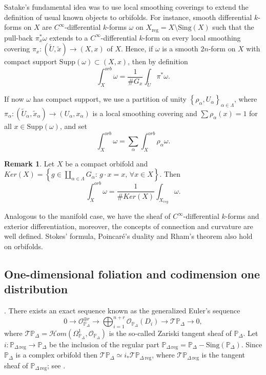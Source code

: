\documentclass[11pt]{amsart}
\theoremstyle{plain}
\theoremstyle{definition}
\newtheorem{obs}{Remark}[section]
\begin{document}
Satake's fundamental idea was to use local smoothing coverings to extend the
definition of usual known objects to orbifolds. For instance, smooth differential $k$-forms
on $X$ are $C^{\infty}$-differential $k$-forms $\omega$ on $X_{\mathrm{reg}}=X \setminus \mathrm{Sing}(X)$ such that the pull-back
$\pi^{\ast}_x\omega$ extends to a $C^{\infty}$-differential $k$-form on every local smoothing covering 
$\pi_x:(\widetilde{U},\tilde{x})\rightarrow(X,x)$ of $X$. Hence, if $\omega$ is a smooth $2n$-form on $X$ with compact support 
$\mathrm{Supp}(\omega)\subset(X, x)$, then by definition
$$\int_X^{orb} \omega=\frac{1}{\# G_x}\int_{\widetilde{U}}\pi^{\ast}\omega.$$

If now $\omega$ has compact support, we use a partition of unity 
$\left\{\rho_{\alpha},U_{\alpha}\right\}_{\alpha\in\Lambda}$, where
$\pi_{\alpha}:(\widetilde{U}_{\alpha},\tilde{x}_{\alpha})\rightarrow(U_{\alpha},x_{\alpha})$ is a local smoothing covering and
$\sum \rho_{\alpha}(x)=1$ for all $x\in\mathrm{Supp}(\omega)$, and set
$$\int_X^{orb} \omega=\sum_{\alpha}\int_{X}^{orb}\rho_{\alpha}\omega.$$

\begin{obs}\cite{Man} Let $X$ be a compact orbifold and 
$Ker(X)=\left\{g\in\coprod_{\alpha\in\Lambda}G_{\alpha}:\,g\cdot x=x,\,\forall x\in X\right\}$. Then 
$$\int_X^{orb} \omega=\frac{1}{\# Ker(X)}\int_{X_{reg}}\omega.$$
\end{obs}

Analogous to the manifold case, we have the sheaf of $C^{\infty}$-differential $k$-forms and
exterior differentiation, moreover, the concepts of connection and curvature are well defined. 
Stokes' formula, Poincar\'e's duality and Rham's theorem also hold on orbifolds.

\subsection{One-dimensional foliation and codimension one distribution} \cite{Mau, Jou, Mig2, Ro}.
There exists an exact sequence known as the generalized Euler's sequence 
$$0\rightarrow \mathcal{O}_{\mathbb{P}_{\Delta}}^{\oplus
r}\rightarrow\bigoplus_{i=1}^{n+r}\mathcal{O}_{\mathbb{P}_{\Delta}}(D_i)\rightarrow
\mathcal{T}\mathbb{P}_{\Delta}\rightarrow0,$$
\noindent where
$\mathcal{T}\mathbb{P}_{\Delta}=\mathcal{H}om(\Omega_{\mathbb{P}_{\Delta}}^1,\mathcal{O}_{\mathbb{P}_{\Delta}})$ is the so-called Zariski tangent sheaf of $\mathbb{P}_{\Delta}$. 
Let $i:\mathbb{P}_{\Delta \,\mathrm{reg}} \rightarrow \mathbb{P}_{\Delta}$
be the inclusion of the regular part $\mathbb{P}_{\Delta \,\mathrm{reg}}= \mathbb{P}_{\Delta} - \mathrm{Sing}(\mathbb{P}_{\Delta})$.
Since $\mathbb{P}_{\Delta}$ is a complex orbifold then $\mathcal{T}\mathbb{P}_{\Delta} \simeq 
i_{\ast}\mathcal{T}\mathbb{P}_{\Delta \,\mathrm{reg}}$, where $\mathcal{T}\mathbb{P}_{\Delta \,\mathrm{reg}}$ is the tangent sheaf of $\mathbb{P}_{\Delta \,\mathrm{reg}}$; 
see \cite[Appendix A.2]{Cox3}.\\
\end{document}
